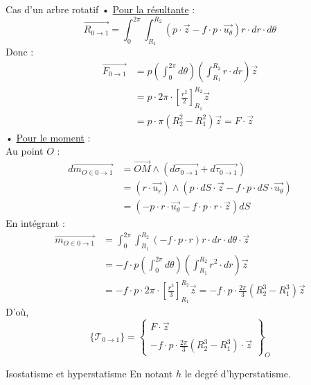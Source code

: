 \documentclass{article} %
\begin{document}
{\begin{exemple}{Cas d'un arbre rotatif}
• \underline{Pour la résultante} :\\
$$\overrightarrow{R_{0\to 1}} = \int_{0}^{2\pi} \int_{R_1}^{R_2} \left( p \cdot \vec{z} - f \cdot p \cdot \vec{u_\theta} \right) r \cdot dr \cdot d\theta$$
Donc :
\begin{align*}
\overrightarrow{F_{0\to 1}} &= p \left( \int_{0}^{2\pi} d\theta \right) \left( \int_{R_1}^{R_2} r \cdot dr \right) \vec{z} \\
&= p \cdot 2\pi \cdot \left[ \frac{r^2}{2} \right]_{R_1}^{R_2} \vec{z}\\
&= p \cdot \pi(R_2^2 - R_1^2) \vec{z} = F \cdot \vec{z}
\end{align*}
• \underline{Pour le moment} :\\
Au point $O$ :\\
\begin{align*}
d\overrightarrow{m_{O\in 0\to 1}} &= \overrightarrow{OM} \wedge \left( d\overrightarrow{\sigma_{0\to 1}} + d\overrightarrow{\tau_{0\to 1}} \right)\\
&= (r \cdot \vec{u_r}) \wedge \left( p \cdot dS \cdot \vec{z} - f \cdot p \cdot dS \cdot \vec{u_\theta} \right)\\
&= \left( -p \cdot r \cdot \vec{u_\theta} - f \cdot p \cdot r \cdot \vec{z} \right) dS
\end{align*}
En intégrant :
\begin{align*}
\overrightarrow{m_{O\in 0\to 1}} &= \int_{0}^{2\pi} \int_{R_1}^{R_2} \left(- f \cdot p \cdot r \right) r \cdot dr \cdot d\theta \cdot \vec{z}\\
&= - f \cdot p \left( \int_{0}^{2\pi} d\theta \right) \left( \int_{R_1}^{R_2} r^2 \cdot dr \right) \vec{z}\\
&= - f \cdot p \cdot 2\pi \cdot \left[ \frac{r^3}{3} \right]_{R_1}^{R_2} \vec{z} = - f \cdot p \cdot \frac{2\pi}{3} (R_2^3 - R_1^3) \vec{z}
\end{align*}
D'où,
$$ \{\mathcal{T}_{0\to 1}\} = \begin{Bmatrix} F \cdot \vec{z} \\ \\ - f \cdot p \cdot \frac{2\pi}{3} (R_2^3 - R_1^3) \cdot \vec{z} \end{Bmatrix}_{O}$$
\end{exemple}\pagebreak
{}
{}
\vspace*{4pt}
\begin{definition}{Isostatisme et hyperstatisme}
En notant $h$ le degré d'hyperstatisme.\\

\end{definition}}
\end{document}
